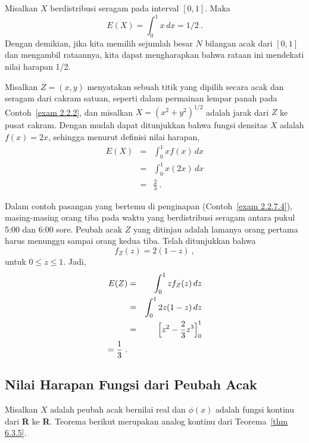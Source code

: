{\begin{example}\label{exam 6.16} Misalkan $X$ berdistribusi seragam pada interval
$[0, 1]$. Maka
$$E(X) = \int_0^1 x\,dx = 1/2\ .$$ Dengan demikian, jika kita memilih sejumlah besar
$N$ bilangan acak dari $[0,1]$ dan mengambil rataannya, kita dapat mengharapkan bahwa
rataan ini mendekati nilai harapan 1/2.
\end{example}

\begin{example}\label{exam 6.17} Misalkan $Z = (x, y)$ menyatakan sebuah titik yang
dipilih secara acak dan seragam dari cakram satuan, seperti dalam permainan lempar
panah pada Contoh~\ref{exam 2.2.2}, dan misalkan $X = (x^2 + y^2)^{1/2}$ adalah jarak
dari $Z$ ke pusat cakram. Dengan mudah dapat ditunjukkan bahwa fungsi densitas $X$
adalah $f(x) = 2x$, sehingga menurut definisi nilai harapan,
\begin{eqnarray*} E(X) & = & \int_0^1 x f(x)\,dx \\ & = & \int_0^1 x (2x)\,dx \\ & =
& \frac 23\ .
\end{eqnarray*}
\end{example}

\begin{example}\label{exam 6.18} Dalam contoh pasangan yang bertemu di penginapan
(Contoh~\ref{exam 2.2.7.4}), masing-masing orang tiba pada waktu yang berdistribusi
seragam antara pukul 5:00 dan 6:00 sore. Peubah acak $Z$ yang ditinjau adalah lamanya
orang pertama harus menunggu sampai orang kedua tiba. Telah ditunjukkan bahwa
$$f_Z(z) = 2(1-z)\ ,$$ untuk $0 \le z \le 1$. Jadi,
\begin{eqnarray*} E(Z) & = & \int_0^1 zf_Z(z)\,dz \\
     & = & \int_0^1 2z(1-z)\,dz \\
     & = & \Bigl[z^2 - \frac 23 z^3\Bigl]_0^1 \\  = \frac 13\ .
\end{eqnarray*}
\end{example}

\subsection*{Nilai Harapan Fungsi dari Peubah Acak}

Misalkan $X$ adalah peubah acak bernilai real dan $\phi(x)$ adalah fungsi kontinu dari
{\bf R} ke {\bf R}. Teorema berikut merupakan analog kontinu dari
Teorema~\ref{thm 6.3.5}.

}
